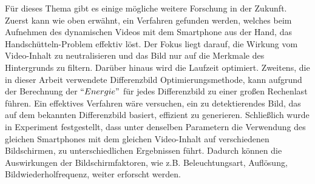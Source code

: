 Für dieses Thema gibt es einige mögliche weitere Forschung in der Zukunft. Zuerst kann wie oben erwähnt, ein Verfahren gefunden werden, welches beim Aufnehmen des dynamischen Videos mit dem Smartphone aus der Hand, das Handschütteln-Problem effektiv löst. Der Fokus liegt darauf, die Wirkung vom Video-Inhalt zu neutralisieren und das Bild nur auf die Merkmale des Hintergrunds zu filtern. Darüber hinaus wird die Laufzeit optimiert. Zweitens, die in dieser Arbeit verwendete Differenzbild Optimierungsmethode, kann aufgrund der Berechnung der $ ``Energie" $ für jedes Differenzbild zu einer großen Rechenlast führen. Ein effektives Verfahren wäre versuchen, ein zu detektierendes Bild, das auf dem bekannten Differenzbild basiert, effizient zu generieren. Schließlich wurde in Experiment festgestellt, dass unter denselben Parametern die Verwendung des gleichen Smartphones mit dem gleichen Video-Inhalt auf verschiedenen Bildschirmen, zu unterschiedlichen Ergebnissen führt. Dadurch können die Auswirkungen der Bildschirmfaktoren, wie z.B. Beleuchtungsart, Auflösung, Bildwiederholfrequenz, weiter erforscht werden.




